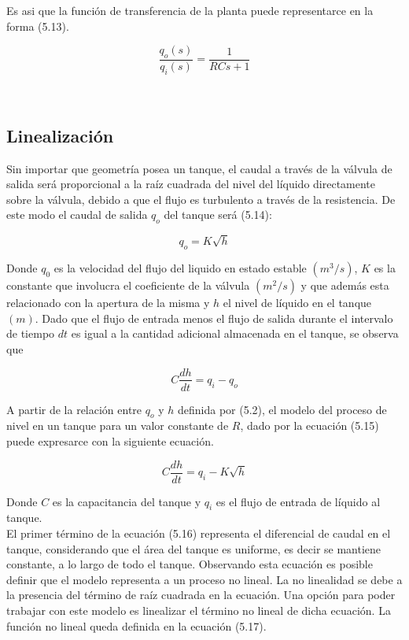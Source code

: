 \documentclass[a4paper,12pt,twoside]{proyectotanquesecci}
\begin{document}
Es asi que la función de transferencia de la planta puede representarce en la forma (5.13).

\begin{equation}
\frac {q_{o}\left( s\right) }{q_{i}\left( s\right) }=\frac {1}{RCs+1}
\end{equation}

\\

\subsection{Linealización}

Sin importar que geometría posea un tanque, el caudal a través de la válvula de salida será proporcional a la raíz cuadrada del nivel del líquido directamente sobre la válvula, debido a que el flujo es turbulento a través de la resistencia. De este modo el caudal de salida $q_{o}$ del tanque será (5.14):

\begin{equation}
q_{o}=K\sqrt{h}
\end{equation}

Donde $q_{0}$ es la velocidad del flujo del liquido en estado estable $(m^{3}/s)$, $K$ es la constante que involucra el coeficiente de la válvula $(m^{2}/s)$ y que además esta relacionado con la apertura de la misma y $h$ el nivel de líquido en el tanque $(m)$. Dado que el flujo de entrada menos el flujo de salida durante el intervalo de tiempo $dt$ es igual a la cantidad adicional almacenada en el tanque, se observa que

\begin{equation}
C\frac{dh}{dt}=q_{i}-q_{o}
\end{equation}

A partir de la relación entre $q_{o}$ y $h$ definida por (5.2), el modelo del proceso de nivel en un tanque para un valor constante de $R$, dado por la ecuación (5.15) puede expresarce con la siguiente ecuación.

\begin{equation}
C\frac{dh}{dt}=q_{i}-K\sqrt{h}
\end{equation}

Donde $C$ es la capacitancia del tanque y $q_{i}$ es el flujo de entrada de líquido al tanque. \\

El primer término de la ecuación (5.16) representa el diferencial de caudal en el tanque, considerando que el área del tanque es uniforme, es decir se mantiene constante, a lo largo de todo el tanque. Observando esta ecuación es posible definir que el modelo representa a un proceso no lineal. La no linealidad se debe a la presencia del término de raíz cuadrada en la ecuación. Una opción para poder trabajar con este modelo es linealizar el término no lineal de dicha ecuación. La función no lineal queda definida en la ecuación (5.17).
\end{document}
